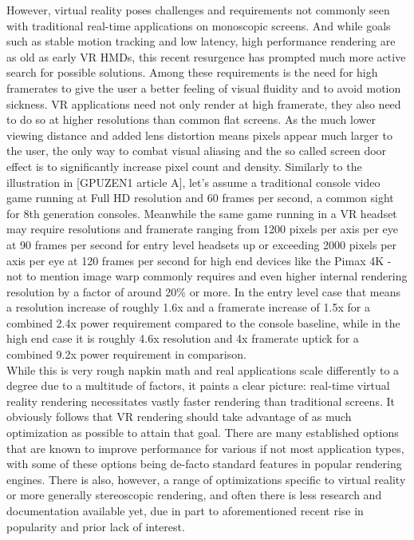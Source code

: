 However, virtual reality poses challenges and requirements not commonly seen with traditional real-time applications on monoscopic screens. And while goals such as stable motion tracking and low latency, high performance rendering are as old as early VR HMDs, this recent resurgence has prompted much more active search for possible solutions. Among these requirements is the need for high framerates to give the user a better feeling of visual fluidity and to avoid motion sickness. VR applications need not only render at high framerate, they also need to do so at higher resolutions than common flat screens. As the much lower viewing distance and added lens distortion means pixels appear much larger to the user, the only way to combat visual aliasing and the so called screen door effect is to significantly increase pixel count and density. Similarly to the illustration in [GPUZEN1 article A], let's assume a traditional console video game running at Full HD resolution and 60 frames per second, a common sight for 8th generation consoles. Meanwhile the same game running in a VR headset may require resolutions and framerate ranging from 1200 pixels per axis per eye at 90 frames per second for entry level headsets up or exceeding 2000 pixels per axis per eye at 120 frames per second for high end devices like the Pimax 4K - not to mention image warp commonly requires and even higher internal rendering resolution by a factor of around 20\% or more. In the entry level case that means a resolution increase of roughly 1.6x and a framerate increase of 1.5x for a combined 2.4x power requirement compared to the console baseline, while in the high end case it is roughly 4.6x resolution and 4x framerate uptick for a combined 9.2x power requirement in comparison. \\
While this is very rough napkin math and real applications scale differently to a degree due to a multitude of factors, it paints a clear picture: real-time virtual reality rendering necessitates vastly faster rendering than traditional screens. It obviously follows that VR rendering should take advantage of as much optimization as possible to attain that goal. There are many established options that are known to improve performance for various if not most application types, with some of these options being de-facto standard features in popular rendering engines. There is also, however, a range of optimizations specific to virtual reality or more generally stereoscopic rendering, and often there is less research and documentation available yet, due in part to aforementioned recent rise in popularity and prior lack of interest. \\

